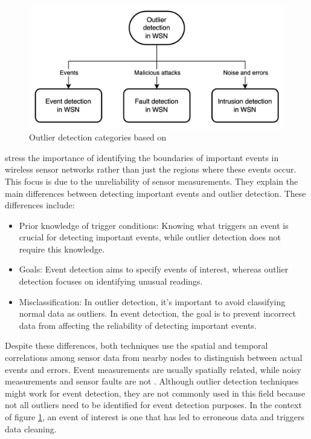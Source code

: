 \begin{figure}[h]
    \centering
    \includegraphics{figures/literature_review/outlier_detection_categories.png}
    \caption{Outlier detection categories based on \cite{zhangOutlierDetectionTechniques2010}
    }
    \label{fig:outlier_detection_categories}
\end{figure}

\cite{dingLocalizedFaulttolerantEvent2005} stress the importance of identifying the boundaries of important events in wireless sensor networks rather than just the regions where these events occur. This focus is due to the unreliability of sensor measurements. They explain the main differences between detecting important events and outlier detection. These differences include:

\begin{itemize}
    \item Prior knowledge of trigger conditions: Knowing what triggers an event is crucial for detecting important events, while outlier detection does not require this knowledge.
    \item Goals: Event detection aims to specify events of interest, whereas outlier detection focuses on identifying unusual readings.
    \item Misclassification: In outlier detection, it’s important to avoid classifying normal data as outliers. In event detection, the goal is to prevent incorrect data from affecting the reliability of detecting important events.
\end{itemize}

Despite these differences, both techniques use the spatial and temporal correlations among sensor data from nearby nodes to distinguish between actual events and errors. Event measurements are usually spatially related, while noisy measurements and sensor faults are not \cite{tehSensorDataQuality2020}. Although outlier detection techniques might work for event detection, they are not commonly used in this field because not all outliers need to be identified for event detection purposes. In the context of figure \ref{fig:outlier_detection_categories}, an event of interest is one that has led to erroneous data and triggers data cleaning.

